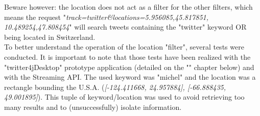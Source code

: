 \documentclass[a4paper,11pt]{report}
\begin{document}
Beware however: the location does not act as a filter for the other filters, which means the request "\emph{track=twitter\&locations=5.956085,45.817851, 10.489254,47.808454}" will search tweets containing the "twitter" keyword OR being located in Switzerland.\\

To better understand the operation of the location "filter", several tests were conducted. It is important to note that those tests have been realized with the "twitter4jDesktop" prototype application (detailed on the "" chapter below) and with the Streaming API. The used keyword was "michel" and the location was a rectangle bounding the U.S.A. (\emph{[-124.411668, 24.957884], [-66.888435, 49.001895]}). This tuple of keyword/location was used to avoid retrieving too many results and to (unsuccessfully) isolate information.
\end{document}
